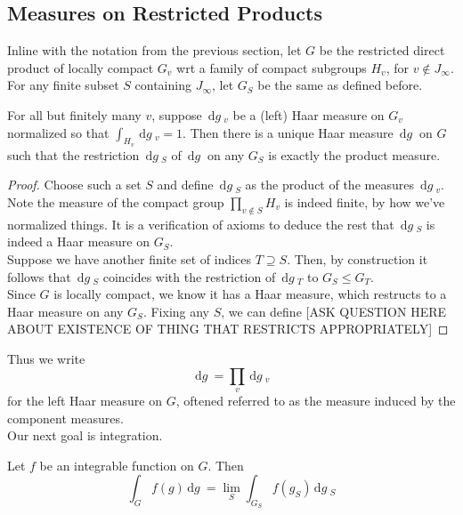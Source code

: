 \documentclass[11pt, x11names]{article}
\newcommand{\dg}{\, \mathrm{d}g \ }
\begin{document}
\subsection{Measures on Restricted Products}
\label{subsection: restricted product measures}
Inline with the notation from the previous section, let $G$ be the restricted direct product of locally compact $G_v$ wrt a family of compact subgroups $H_v$, for $v \notin J_\infty$. For any finite subset $S$ containing $J_\infty$, let $G_S$ be the same as defined before.
\begin{prop}
\label{Haar Measure on restricted product}
For all but finitely many $v$, suppose $\dg_v$ be a (left) Haar measure on $G_v$ normalized so that $\int_{H_v} \dg_v = 1$. Then there is a unique Haar measure $\dg$ on $G$ such that the restriction $\dg_S$ of $\dg$ on any $G_S$ is exactly the product measure.
\end{prop}
\begin{proof}
Choose such a set $S$ and define $\dg_S$ as the product of the measures $\dg_v$. Note the measure of the compact group $\prod_{v \notin S} H_v$ is indeed finite, by how we've normalized things. It is a verification of axioms to deduce the rest that $\dg_S$ is indeed a Haar measure on $G_S$.\\
Suppose we have another finite set of indices $T \supseteq S$. Then, by construction it follows that $\dg_S$ coincides with the restriction of $\dg_T$ to $G_S \leq G_T$.\\

Since $G$ is locally compact, we know it has a Haar measure, which restructs to a Haar measure on any $G_S$. Fixing any $S$, we can define [ASK QUESTION HERE ABOUT EXISTENCE OF THING THAT RESTRICTS APPROPRIATELY]
\end{proof}

Thus we write 
\begin{equation*}
    \dg = \prod_v \dg_v
\end{equation*}
for the left Haar measure on $G$, oftened referred to as the measure induced by the component measures.\\

Our next goal is integration.
\begin{prop}
\label{Restricted Product Integral is limit of finite integrals}

Let $f$ be an integrable function on $G$. Then
\begin{equation*}
    \int_G f(g) \dg = \lim_S \int_{G_S}f(g_S) \dg_S
\end{equation*}

\end{prop}
\end{document}
